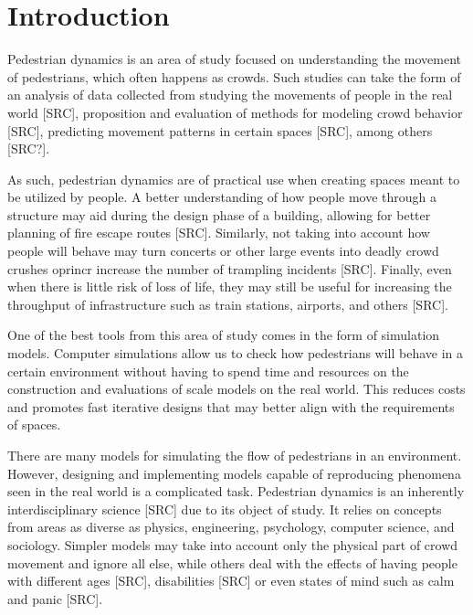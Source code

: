 \documentclass[twoside, 11pt]{article}
\begin{document}
 
\blankpage
\newpage

\printglossary[type=\acronymtype,nonumberlist, title=List of Abbreviations]
\newpage

\mainmatter

\section{Introduction}

Pedestrian dynamics is an area of study focused on understanding the movement of pedestrians, which often happens as crowds. Such studies can take the form of an analysis of data collected from studying the movements of people in the real world [SRC], proposition and evaluation of methods for modeling crowd behavior [SRC], predicting movement patterns in certain spaces [SRC], among others [SRC?].

As such, pedestrian dynamics are of practical use when creating spaces meant to be utilized by people. A better understanding of how people move through a structure may aid during the design phase of a building, allowing for better planning of fire escape routes [SRC]. Similarly, not taking into account how people will behave may turn concerts or other large events into deadly crowd crushes oprincr increase the number of trampling incidents [SRC]. Finally, even when there is little risk of loss of life, they may still be useful for increasing the throughput of infrastructure such as train stations, airports, and others [SRC].

One of the best tools from this area of study comes in the form of simulation models. Computer simulations allow us to check how pedestrians will behave in a certain environment without having to spend time and resources on the construction and evaluations of scale models on the real world. This reduces costs and promotes fast iterative designs that may better align with the requirements of spaces.

There are many models for simulating the flow of pedestrians in an environment. However, designing and implementing models capable of reproducing phenomena seen in the real world is a complicated task. Pedestrian dynamics is an inherently interdisciplinary science [SRC] due to its object of study. It relies on concepts from areas as diverse as physics, engineering, psychology, computer science, and sociology. Simpler models may take into account only the physical part of crowd movement and ignore all else, while others deal with the effects of having people with different ages [SRC], disabilities [SRC] or even states of mind such as calm and panic [SRC].
\end{document}
